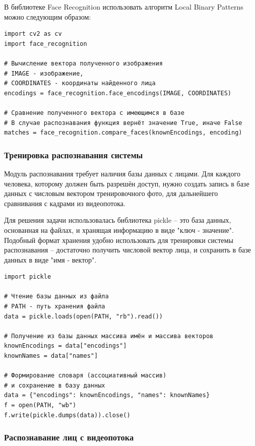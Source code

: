 В библиотеке Face Recognition использовать алгоритм Local Binary Patterns можно следующим
образом:

\begin{lstlisting}
import cv2 as cv
import face_recognition

# Вычисление вектора полученного изображения
# IMAGE - изображение, 
# COORDINATES - координаты найденного лица
encodings = face_recognition.face_encodings(IMAGE, COORDINATES)

# Сравнение полученного вектора с имеющимся в базе
# В случае распознавания функция вернёт значение True, иначе False
matches = face_recognition.compare_faces(knownEncodings, encoding)
\end{lstlisting}

\subsubsection{Тренировка распознавания системы}

Модуль распознавания требует наличия базы данных с лицами. Для каждого
человека, которому должен быть разрешён доступ, нужно создать запись в базе
данных с числовым вектором тренировочного фото, для дальнейшего сравнивания
с кадрами из видеопотока. 

Для решения задачи использовалась библиотека pickle -- это база данных,
основанная на файлах, и хранящая информацию в виде "ключ - значение". Подобный
формат хранения удобно использовать для тренировки системы распознавания --
достаточно получить числовой вектор лица, и сохранить в базе данных в виде "имя
- вектор". 

\begin{lstlisting}
import pickle

# Чтение базы данных из файла
# PATH - путь хранения файла
data = pickle.loads(open(PATH, "rb").read())

# Получение из базы данных массива имён и массива векторов
knownEncodings = data["encodings"]
knownNames = data["names"]

# Формирование словаря (ассоциативный массив)
# и сохранение в базу данных
data = {"encodings": knownEncodings, "names": knownNames}
f = open(PATH, "wb")
f.write(pickle.dumps(data)).close()
\end{lstlisting}

\subsubsection{Распознавание лиц с видеопотока}

